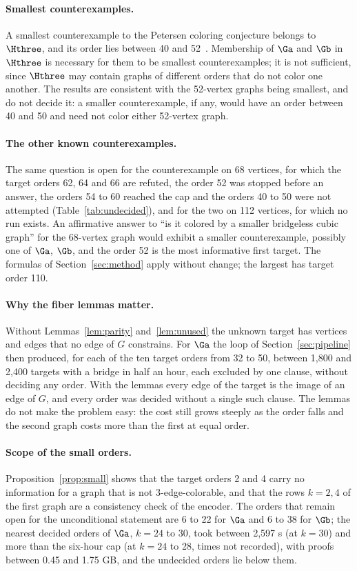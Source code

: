 \paragraph{Smallest counterexamples.} A smallest counterexample to the Petersen coloring conjecture belongs to $\Hthree$, and its order lies between 40 and 52~\cite{GJMMMU2026}. Membership of $\Ga$ and $\Gb$ in $\Hthree$ is necessary for them to be smallest counterexamples; it is not sufficient, since $\Hthree$ may contain graphs of different orders that do not color
one another. The results are consistent with the 52-vertex graphs being smallest, and do not decide it: a smaller counterexample, if any, would have an order between 40 and 50 and need not color either 52-vertex graph.

\paragraph{The other known counterexamples.} The same question is open for the counterexample on 68 vertices, for which the target orders 62, 64 and 66 are refuted, the order 52 was stopped before an answer, the orders 54 to 60 reached the cap and the orders 40 to 50 were not attempted (Table~\ref{tab:undecided}), and for the two on 112 vertices, for which no run exists. An affirmative answer to ``is it colored by a smaller bridgeless cubic graph'' for the
68-vertex graph would exhibit a smaller counterexample, possibly one of $\Ga$, $\Gb$, and the order 52 is the most informative first target. The formulas of Section~\ref{sec:method} apply without change; the largest has target order 110.

\paragraph{Why the fiber lemmas matter.} Without Lemmas~\ref{lem:parity} and~\ref{lem:unused} the unknown target has vertices and edges that no edge of $G$ constrains. For $\Ga$ the loop of Section~\ref{sec:pipeline} then produced, for each of the ten target orders from 32 to 50, between 1{,}800 and 2{,}400 targets with a bridge in half an hour, each excluded by one clause, without deciding any order. With the lemmas every edge of
the target is the image of an edge of $G$, and every order was decided without a single such clause. The lemmas do not make the problem easy: the cost still grows steeply as the order falls and the second graph costs more than the first at equal order.

\paragraph{Scope of the small orders.} Proposition~\ref{prop:small} shows that the target orders 2 and 4 carry no information for a graph that is not 3-edge-colorable, and that the rows $k=2,4$ of the first graph are a consistency check of the encoder. The orders that remain open for the unconditional statement are 6 to 22 for $\Ga$ and 6 to 38 for $\Gb$; the nearest decided orders of $\Ga$, $k = 24$ to 30, took between 2{,}597 s (at $k = 30$) and more than the six-hour cap (at $k = 24$ to 28, times not recorded), with proofs between 0.45 and 1.75 GB, and the undecided orders lie below them.

